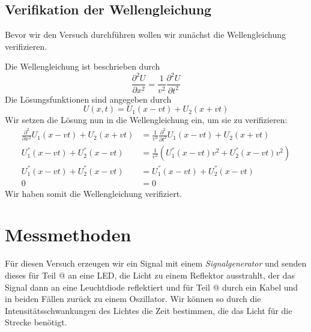 \documentclass[10pt,a4paper]{article}
\makeatletter
\newcommand*{\rom}[1]{\expandafter\@slowromancap\romannumeral #1@}
\makeatother
\begin{document}
\subsection{Verifikation der Wellengleichung}
\begin{flushleft}
Bevor wir den Versuch durchführen wollen wir zunächst die Wellengleichung verifizieren.

Die Wellengleichung ist beschrieben durch
\begin{equation}\label{eq:welle}
\frac{\partial^2 U}{\partial x^2} = \frac{1}{v^2} \frac{\partial^2 U}{\partial t^2}
\end{equation}
Die Lösungsfunktionen sind angegeben durch
\begin{equation}\label{eq:wloes}
U(x, t) = U_1(x - vt) + U_2 (x + vt)
\end{equation}
Wir setzen die Lösung nun in die Wellengleichung ein, um sie zu verifizieren:
\begin{align*}
\frac{\partial^2}{\partial x^2} U_1(x - vt) + U_2 (x + vt) &= \frac{1}{v^2} \frac{\partial^2}{\partial t^2} U_1(x - vt) + U_2 (x + vt) \\
U_1^{''}(x - vt) + U_2^{''}(x - vt) &= \frac{1}{v^2} (U_1^{''}(x - vt)v^2 + U_2^{''}(x - vt)v^2) \\
U_1^{''}(x - vt) + U_2^{''}(x - vt) &= U_1^{''}(x - vt) + U_2^{''}(x - vt) \\
0 &= 0
\end{align*}
Wir haben somit die Wellengleichung verifiziert.
\end{flushleft}

\section{Messmethoden}
\begin{flushleft}
Für diesen Versuch erzeugen wir ein Signal mit einem \textit{Signalgenerator} und senden dieses für Teil \rom{1} an eine LED, die Licht zu einem Reflektor ausstrahlt, der das Signal dann an eine Leuchtdiode reflektiert und für Teil \rom{2} durch ein Kabel und in beiden Fällen zurück zu einem Oszillator. Wir können so durch die Intensitätsschwankungen des Lichtes die Zeit bestimmen, die das Licht für die Strecke benötigt.
\end{flushleft}
\end{document}
